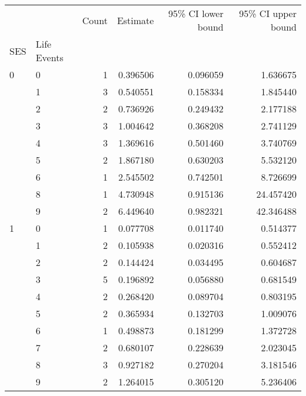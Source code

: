 \begin{tabular}{llrrrr}
\toprule
  &   &  Count &  Estimate &  95\% CI lower bound &  95\% CI upper bound \\
SES & Life Events &        &           &                     &                     \\
\midrule
0 & 0 &      1 &  0.396506 &            0.096059 &            1.636675 \\
  & 1 &      3 &  0.540551 &            0.158334 &            1.845440 \\
  & 2 &      2 &  0.736926 &            0.249432 &            2.177188 \\
  & 3 &      3 &  1.004642 &            0.368208 &            2.741129 \\
  & 4 &      3 &  1.369616 &            0.501460 &            3.740769 \\
  & 5 &      2 &  1.867180 &            0.630203 &            5.532120 \\
  & 6 &      1 &  2.545502 &            0.742501 &            8.726699 \\
  & 8 &      1 &  4.730948 &            0.915136 &           24.457420 \\
  & 9 &      2 &  6.449640 &            0.982321 &           42.346488 \\
1 & 0 &      1 &  0.077708 &            0.011740 &            0.514377 \\
  & 1 &      2 &  0.105938 &            0.020316 &            0.552412 \\
  & 2 &      2 &  0.144424 &            0.034495 &            0.604687 \\
  & 3 &      5 &  0.196892 &            0.056880 &            0.681549 \\
  & 4 &      2 &  0.268420 &            0.089704 &            0.803195 \\
  & 5 &      2 &  0.365934 &            0.132703 &            1.009076 \\
  & 6 &      1 &  0.498873 &            0.181299 &            1.372728 \\
  & 7 &      2 &  0.680107 &            0.228639 &            2.023045 \\
  & 8 &      3 &  0.927182 &            0.270204 &            3.181546 \\
  & 9 &      2 &  1.264015 &            0.305120 &            5.236406 \\
\bottomrule
\end{tabular}
